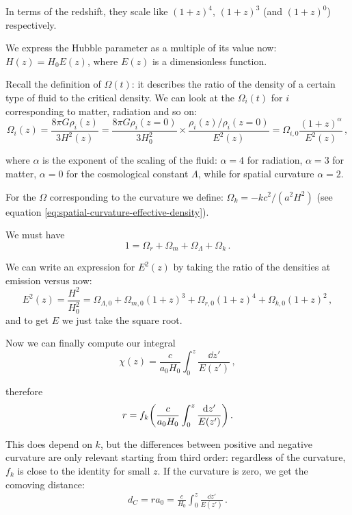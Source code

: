 \documentclass[main.tex]{subfiles}
\begin{document}
In terms of the redshift, they scale like \((1+z)^{4}\), \((1+z)^{3}\) (and \((1+z)^{0}\)) respectively.

We express the Hubble parameter as a multiple of its value now: \(H(z) = H_0 E(z)\), where \(E(z)\) is a dimensionless function.

Recall the definition of \(\Omega (t)\): it describes the ratio of the density of a certain type of fluid to the critical density. We can look at the \(\Omega_i (t)\) for \(i\) corresponding to matter, radiation and so on: 
%
\begin{equation}
  \Omega _i (z) = \frac{8 \pi G \rho _i (z)}{3 H^2(z)}
  = \frac{8 \pi G \rho_{i}(z=0)}{3 H_0 ^2} \times  \frac{\rho _i (z) / \rho_{i}(z=0)}{E^2(z)}
  = \Omega _{i,0} \frac{(1+z)^{\alpha }}{E^2(z)}
\,,
\end{equation}

where \(\alpha \) is the exponent of the scaling of the fluid: \(\alpha = 4\) for radiation, \(\alpha = 3\) for matter, \(\alpha = 0\) for the cosmological constant \(\Lambda \), while for spatial curvature \(\alpha = 2\).

For the \(\Omega \) corresponding to the curvature we define: \(\Omega _k = - k c^2/(a^2 H^2)\) (see equation \eqref{eq:spatial-curvature-effective-density}).

We must have 
%
\begin{equation}
  1 = \Omega _r + \Omega _m + \Omega _\Lambda + \Omega _k
\,.
\end{equation}

We can write an expression for \(E^2(z)\) by taking the ratio of the densities at emission versus now:
%
\begin{equation}
  E^2(z) = \frac{H^2}{H_0^2} = 
  \Omega _{\Lambda , 0} +  \Omega_{m, 0} (1+z)^{3} 
  +\Omega_{r, 0} (1+z)^4 + \Omega _{k, 0} (1+z)^2
\,,
\end{equation}
%
and to get \(E\) we just take the square root.

Now we can finally compute our integral 
%
\begin{equation}
  \chi (z) = \frac{c}{a_0 H_0 } \int_{0}^{z} \frac{\dd{z'} }{E(z')}
\,,
\end{equation}
%

therefore 
%
\begin{equation}
  r = f_k \qty(\frac{c}{a_0 H_0 } \int_0^z \frac{\dd{z'}   }{E(z')})
\,.
\end{equation}
%

This does depend on \(k\), but the differences between positive and negative curvature are only relevant starting from third order: regardless of the curvature, \(f_k\) is close to the identity for small \(z\).
If the curvature is zero, we get the comoving distance:
%
\begin{align}
d_C = r a_0 = \frac{c}{H_0 } \int_{0}^{z} \frac{ \dd{z'}}{E(z')}
\,.
\end{align}
\end{document}
